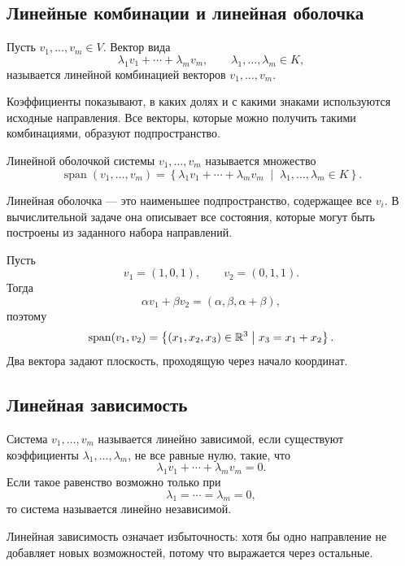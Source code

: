 \subsection{Линейные комбинации и линейная оболочка}

\begin{definition}
Пусть \(v_1,\dots,v_m\in V\). Вектор вида
\[
\lambda_1v_1+\cdots+\lambda_mv_m,
\qquad
\lambda_1,\dots,\lambda_m\in K,
\]
называется линейной комбинацией векторов \(v_1,\dots,v_m\).
\end{definition}

Коэффициенты показывают, в каких долях и с какими знаками используются исходные направления. Все векторы, которые можно получить такими комбинациями, образуют подпространство.

\begin{definition}
Линейной оболочкой системы \(v_1,\dots,v_m\) называется множество
\[
\operatorname{span}(v_1,\dots,v_m)
=
\left\{
\lambda_1v_1+\cdots+\lambda_mv_m
\;\middle|\;
\lambda_1,\dots,\lambda_m\in K
\right\}.
\]
\end{definition}

Линейная оболочка --- это наименьшее подпространство, содержащее все \(v_i\). В вычислительной задаче она описывает все состояния, которые могут быть построены из заданного набора направлений.

\begin{example}
Пусть
\[
v_1=(1,0,1),
\qquad
v_2=(0,1,1).
\]
Тогда
\[
\alpha v_1+\beta v_2=(\alpha,\beta,\alpha+\beta),
\]
поэтому
\[
\operatorname{span}(v_1,v_2)
=
\left\{(x_1,x_2,x_3)\in\mathbb{R}^3
\;\middle|\;
x_3=x_1+x_2\right\}.
\]
Два вектора задают плоскость, проходящую через начало координат.
\end{example}

\subsection{Линейная зависимость}

\begin{definition}
Система \(v_1,\dots,v_m\) называется линейно зависимой, если существуют коэффициенты \(\lambda_1,\dots,\lambda_m\), не все равные нулю, такие, что
\[
\lambda_1v_1+\cdots+\lambda_mv_m=0.
\]
Если такое равенство возможно только при
\[
\lambda_1=\cdots=\lambda_m=0,
\]
то система называется линейно независимой.
\end{definition}

Линейная зависимость означает избыточность: хотя бы одно направление не добавляет новых возможностей, потому что выражается через остальные.


